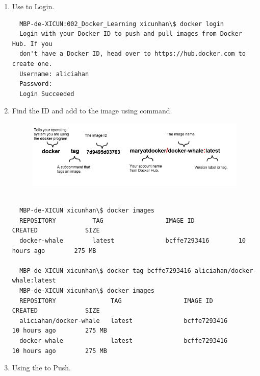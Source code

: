 \documentclass[12pt,a4paper]{article}
\begin{document}
\begin{enumerate}
  \item Use \textit{{\color{violet}{docker login}}} to Login. \\
  \begin{verbatim}
  MBP-de-XICUN:002_Docker_Learning xicunhan\$ docker login
  Login with your Docker ID to push and pull images from Docker Hub. If you
  don't have a Docker ID, head over to https://hub.docker.com to create one.
  Username: aliciahan
  Password:
  Login Succeeded
  \end{verbatim}
  \FloatBarrier

  \item Find the ID and add \textit{{\color{brown}{namespace}}} to the image using \textit{{\color{violet}{docker tag}}} command.\\

  \begin{figure}[h]
  \begin{center}
    \includegraphics[scale=0.5]{tagger.png}
  \end{center}
  \end{figure}
   \FloatBarrier

  \begin{verbatim}

  MBP-de-XICUN xicunhan\$ docker images
  REPOSITORY          TAG                 IMAGE ID            CREATED             SIZE
  docker-whale        latest              bcffe7293416        10 hours ago        275 MB

  MBP-de-XICUN xicunhan\$ docker tag bcffe7293416 aliciahan/docker-whale:latest
  MBP-de-XICUN xicunhan\$ docker images
  REPOSITORY               TAG                 IMAGE ID            CREATED             SIZE
  aliciahan/docker-whale   latest              bcffe7293416        10 hours ago        275 MB
  docker-whale             latest              bcffe7293416        10 hours ago        275 MB

  \end{verbatim}
  \FloatBarrier

  \item Using the \textit{{\color{violet}{docker push aliciahan/docker-whale}}} to Push.
\end{enumerate}
\end{document}
